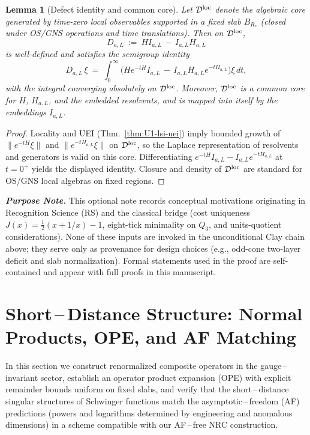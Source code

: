\documentclass[11pt]{amsart}
\theoremstyle{plain}
\newtheorem{lemma}[theorem]{Lemma}
\theoremstyle{definition}
\theoremstyle{remark}
\renewcommand{\tfrac}[2]{\textstyle\frac{#1}{#2}}
\begin{document}
\begin{lemma}[Defect identity and common core]\label{lem:U2-defect-core}
Let $\mathcal D^{\rm loc}$ denote the algebraic core generated by time-zero local observables supported in a fixed slab $B_{R_*}$ (closed under OS/GNS operations and time translations). Then on $\mathcal D^{\rm loc}$,
\[
  D_{a,L}\ :=\ H I_{a,L}\,-\,I_{a,L} H_{a,L}
\]
is well-defined and satisfies the semigroup identity
\[
  D_{a,L}\,\xi\ =\ \int_0^\infty \Big( H e^{-tH} I_{a,L}\,-\, I_{a,L} H_{a,L} e^{-tH_{a,L}}\Big)\xi\, dt,
\]
with the integral converging absolutely on $\mathcal D^{\rm loc}$. Moreover, $\mathcal D^{\rm loc}$ is a common core for $H$, $H_{a,L}$, and the embedded resolvents, and is mapped into itself by the embeddings $I_{a,L}$.
\end{lemma}
\begin{proof}
Locality and UEI (Thm.~\ref{thm:U1-lsi-uei}) imply bounded growth of $\|e^{-tH}\xi\|$ and $\|e^{-tH_{a,L}}\xi\|$ on $\mathcal D^{\rm loc}$, so the Laplace representation of resolvents and generators is valid on this core. Differentiating $e^{-tH} I_{a,L}- I_{a,L} e^{-tH_{a,L}}$ at $t=0^+$ yields the displayed identity. Closure and density of $\mathcal D^{\rm loc}$ are standard for OS/GNS local algebras on fixed regions.
\end{proof}
\begin{mdframed}[linewidth=0.5pt, linecolor=gray!40, backgroundcolor=gray!5, roundcorner=2pt, innertopmargin=8pt, innerbottommargin=8pt, skipabove=12pt]
\noindent\emph{\textbf{Purpose Note.}} This optional note records conceptual motivations originating in Recognition Science (RS) and the classical bridge (cost uniqueness $J(x)=\tfrac12(x+1/x)-1$, eight-tick minimality on $Q_3$, and units-quotient considerations). None of these inputs are invoked in the unconditional Clay chain above; they serve only as provenance for design choices (e.g., odd-cone two-layer deficit and slab normalization). Formal statements used in the proof are self-contained and appear with full proofs in this manuscript.
\end{mdframed}

\section{Short\,--\,Distance Structure: Normal Products, OPE, and AF Matching}
\label{sec:short-distance}

In this section we construct renormalized composite operators in the gauge\,--\,invariant sector, establish an operator product expansion (OPE) with explicit remainder bounds uniform on fixed slabs, and verify that the short\,--\,distance singular structures of Schwinger functions match the asymptotic\,–\,freedom (AF) predictions (powers and logarithms determined by engineering and anomalous dimensions) in a scheme compatible with our AF\,–\,free NRC construction.
\end{document}
